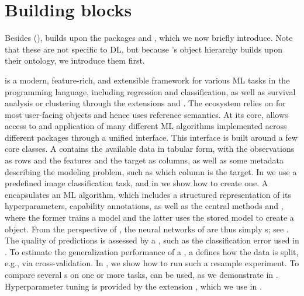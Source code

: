 \documentclass[article,shortnames]{jss}
\theoremstyle{definition}
\begin{document}
\section{Building blocks}\label{sec:building-blocks}


Besides  (),  builds upon the \rlang{} packages  \citep{ref-mlr32019} and  \citep{ref-mlr3pipelines2021}, which we now briefly introduce.
Note that these are not specific to DL, but because 's object hierarchy builds upon their ontology, we introduce them first.

 is a modern, feature-rich, and extensible framework for various ML tasks in the \rlang{} programming language, including regression and classification, as well as survival analysis or clustering through the extensions  \citep{sonabend2021mlr3proba} and  \citep{ref-mlr3cluster}.
The ecosystem relies on  \citep{ref-r6chang} for most user-facing objects and hence uses reference semantics.
At its core,  allows access to and application of many different ML algorithms implemented across different \rlang{} packages through a unified interface.
This interface is built around a few core  classes.
A  contains the available data in tabular form, with the observations as rows and the features and the target as columns, as well as some metadata describing the modeling problem, such as which column is the target.
In  we use a predefined image classification task, and in  we show how to create one.
A  encapsulates an ML algorithm, which includes a structured representation of its hyperparameters, capability annotations, as well as the central methods  and , where the former trains a model and the latter uses the stored model to create a  object.
From the perspective of \mlrt{}, the neural networks of \mlrttorch{} are thus simply s; see .
The quality of predictions is assessed by a , such as the classification error used in .
To estimate the generalization performance of a , a  defines how the data is split, e.g., via cross-validation.
In , we show how to run such a resample experiment.
To compare several s on one or more tasks,  can be used, as we demonstrate in .
Hyperparameter tuning is provided by the  extension \citep{ref-mlr3tuning2024}, which we use in .
\end{document}

